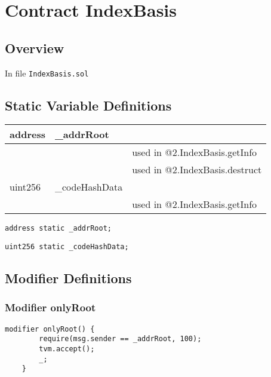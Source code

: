 
\chapter{Contract IndexBasis}

\minitoc

\section{Overview}


In file {\tt IndexBasis.sol}

\section{Static Variable Definitions}


\ifsoltables
\noindent\begin{tabular}{|l|l|p{5cm}|}\hline
address & \_{}addrRoot &  \\\hline
 & & used in @2.IndexBasis.getInfo\\\hline
 & & used in @2.IndexBasis.destruct\\\hline
uint256 & \_{}codeHashData &  \\\hline
 & & used in @2.IndexBasis.getInfo\\\hline
\end{tabular}
\fi


\begin{lstlisting}[firstnumber=7]
    address static _addrRoot;
\end{lstlisting}

\begin{lstlisting}[firstnumber=8]
    uint256 static _codeHashData;
\end{lstlisting}

\section{Modifier Definitions}


\subsection{Modifier onlyRoot}



\begin{lstlisting}[firstnumber=10]
    modifier onlyRoot() {
        require(msg.sender == _addrRoot, 100);
        tvm.accept();
        _;
    }
\end{lstlisting}

